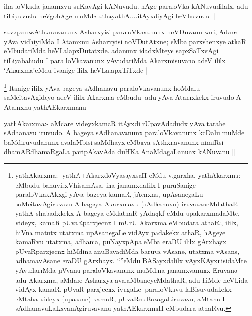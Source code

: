 
\begin{artha}
iha loVkada janamxvu suKavAgi kANuvudu. hAge paraloVka kANuvudilalx, adu tiLiyuvudu heVgohAge muMde athayathA....itAyxdiyAgi heVLuvudu ||
\end{artha}

\begin{artha}
savxpanxsAthxnavanunx Asharxyisi paraloVkavanunx noVDuvanu sari, Adare yAva vidhiyiMda I Atamxnu Asharxyisi noVDutAtxne; eMba parxshenxye athaR eMbudariMda heVLalapxDutatxde. adanunx idadxMteye sapxSaTxvAgi tiLiyabahudu I para loVkavanunx yAvudariMda Akarxmisuvano adeV ililx `Akarxma'eMdu ivanige ililx heVLalapxTiTxde ||
\end{artha}


\begin{artha}
\footnote[1]{yathA\s karxma:- yathA+AkarxdoVyasayxsaH eMdu vigarxha, yathAkarxma: eMbudu bahuvirxVhisamAsa, iha janamxdalilx I puruSanige paraloVkakAkxgi yAva bageya kamaR, jAcnxna, upAsanegaLu saMcitavAgiruvavo A bageya Akarxmavu (sAdhanavu) iruvavaneMdathaR yathA shabadxkekx A bageya eMdathaR yAdaqkf eMdu upakarxmadaMte, videyx, kamaR pUvaRparxjecnx I mUrU Akarxma eMbudara athaR:, ililx, hiVna matutx utatxma upAsanegaLe vidAyx padakekx athaR, hAgeye kamaRvu utatxma, adhama, puNayxpApa eMba eraDU ililx gArxhayx pUvaRparxjecnx hiMdina anuBavadiMda baruva vAsane, utatxma vAsane, adhamavAsane eraDU gArxhayx. ``\stext''eMdu BASayxdalilx vAyxKAyxnisidaMte yAvudariMda jiVvanu paraloVkavanunx muMdina janamxvanunx Eruvano adu Akarxma, aMdare Asharxya avalaMbaneyeMdathaR, adu hiMde heVLida vidAyx kamaR, pUvaR parxjecnx ivugaLe. paraloVkavu laBisuvudakekx eMtaha videyx (upasane) kamaR, pUvaRnuBavagaLiruvavo, aMtaha I sAdhanavuLaLxvanAgiruvavanu yathAE\s karxmaH eMbudara athaRvu.}
Itanige ililx yAva bageya sAdhanavu paraloVkavanunx hoMdalu saMcitavAgideyo adeV ililx Akarxma eMbudu, adu yAva Atamxkekx iruvudo A Atamxnu yathAE\s karxmanu
\end{artha}

\begin{artha}
yathAkarxma:- aMdare videyxkamaR itAyxdi rUpavAdadudx yAva tarahe sAdhanavu iruvudo, A bageya sAdhanavanunx paraloVkavanunx koDalu muMde baMdiruvudanunx avalaMbisi saMdhayx eMbuva sAthxnavanunx nimiRsi dhamARdhamaRgaLa paripAkavAda duHKa AnaMdagaLanunx kANuvanu ||
\end{artha}

